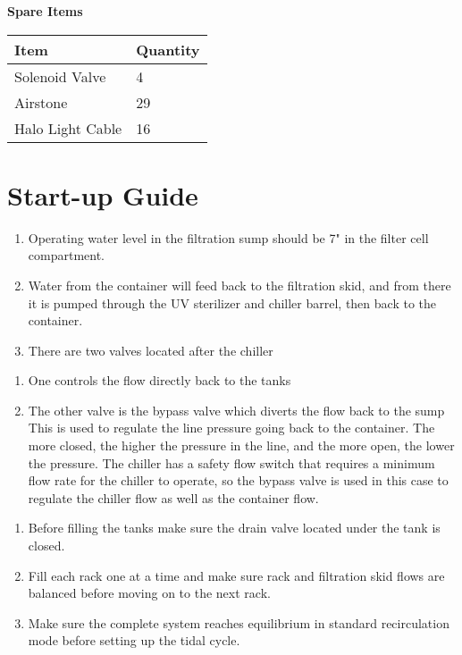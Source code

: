 \documentclass[]{book}
\providecommand{\tightlist}{%
  \setlength{\itemsep}{0pt}\setlength{\parskip}{0pt}}
\begin{document}
\textbf{Spare Items}

\begin{longtable}[]{@{}ll@{}}
\toprule
Item & Quantity\tabularnewline
\midrule
\endhead
Solenoid Valve & 4\tabularnewline
Airstone & 29\tabularnewline
Halo Light Cable & 16\tabularnewline
\bottomrule
\end{longtable}

\chapter{Start-up Guide}\label{start-up-guide}

\begin{enumerate}
\def\labelenumi{\arabic{enumi}.}
\tightlist
\item
  Operating water level in the filtration sump should be 7" in the
  filter cell compartment.
\item
  Water from the container will feed back to the filtration skid, and
  from there it is pumped through the UV sterilizer and chiller barrel,
  then back to the container.
\item
  There are two valves located after the chiller
\end{enumerate}

\begin{enumerate}
\def\labelenumi{\alph{enumi}.}
\item
  One controls the flow directly back to the tanks
\item
  The other valve is the bypass valve which diverts the flow back to the
  sump This is used to regulate the line pressure going back to the
  container. The more closed, the higher the pressure in the line, and
  the more open, the lower the pressure. The chiller has a safety flow
  switch that requires a minimum flow rate for the chiller to operate,
  so the bypass valve is used in this case to regulate the chiller flow
  as well as the container flow.
\end{enumerate}

\begin{enumerate}
\def\labelenumi{\arabic{enumi}.}
\setcounter{enumi}{3}
\tightlist
\item
  Before filling the tanks make sure the drain valve located under the
  tank is closed.
\item
  Fill each rack one at a time and make sure rack and filtration skid
  flows are balanced before moving on to the next rack.
\item
  Make sure the complete system reaches equilibrium in standard
  recirculation mode before setting up the tidal cycle.
\end{enumerate}
\end{document}
